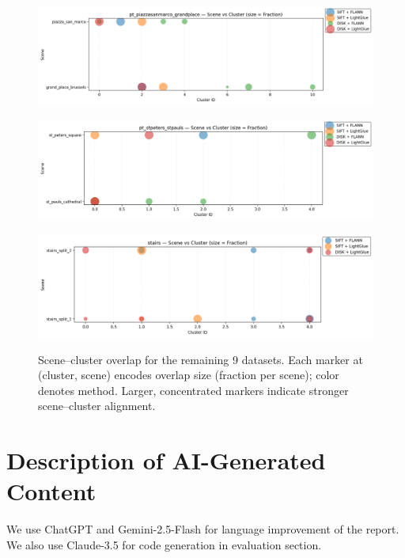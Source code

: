 \documentclass[report.tex]{subfiles}
\begin{document}
    \begin{figure}[htbp]\ContinuedFloat
        \begin{minipage}{\textwidth}
            \centering
            \includegraphics[width=\linewidth]{images/scene_cluster_by_dataset/pt_piazzasanmarco_grandplace.png}
            \label{fig:scene-cluster-A7}
        \end{minipage}

        \begin{minipage}{\textwidth}
            \centering
            \includegraphics[width=\linewidth]{images/scene_cluster_by_dataset/pt_stpeters_stpauls.png}
            \label{fig:scene-cluster-A8}
        \end{minipage}

        \begin{minipage}{\textwidth}
            \centering
            \includegraphics[width=\linewidth]{images/scene_cluster_by_dataset/stairs.png}
            \label{fig:scene-cluster-A9}
        \end{minipage}

        \caption{Scene–cluster overlap for the remaining 9 datasets. Each marker at (cluster, scene) encodes overlap size (fraction per scene); color denotes method. Larger, concentrated markers indicate stronger scene–cluster alignment.}
        \label{fig:scene-cluster-9up}
    \end{figure}

    \chapter{Description of AI-Generated Content}\label{appendix:B}
    We use ChatGPT and Gemini-2.5-Flash for language improvement of the report. We also use Claude-3.5 for code generation in evaluation section.
\end{document}
